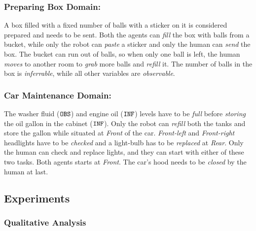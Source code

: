 \documentclass[letterpaper]{article} %
\begin{document}
\subsubsection{Preparing Box Domain:}
A box filled with a fixed number of balls with a sticker on it is considered prepared and needs to be sent. Both the agents can \textit{fill} the box with balls from a bucket, while only the robot can \textit{paste} a sticker and only the human can \textit{send} the box. The bucket can run out of balls, so when only one ball is left, the human \textit{moves} to another room to \textit{grab} more balls and \textit{refill} it. 
The number of balls in the box is \textit{inferrable}, while all other variables are {\em observable}. 

\subsubsection{Car Maintenance Domain:}
The washer fluid ($\texttt{OBS}$) and engine oil ($\texttt{INF}$) levels have to be \textit{full} before \textit{storing} the oil gallon in the cabinet ($\texttt{INF}$). 
Only the robot can \textit{refill} both the tanks and store the gallon while situated at \textit{Front} of the car. 
\textit{Front-left} and \textit{Front-right} headlights have to be \textit{checked} and a light-bulb has to be \textit{replaced} at \textit{Rear}. 
Only the human can check and replace lights, and they can start with either of these two tasks.
Both agents starts at \textit{Front}.
The car's hood needs to be \textit{closed} by the human at last.

\subsection{Experiments}

% 
\subsubsection{Qualitative Analysis}
\end{document}
